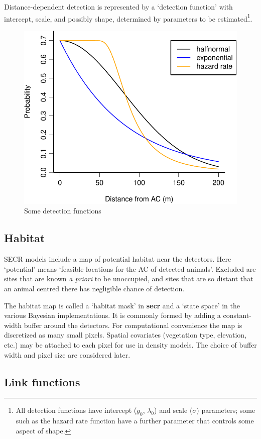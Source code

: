 \documentclass[
]{book}
\begin{document}
Distance-dependent detection is represented by a `detection function' with intercept, scale, and possibly shape, determined by parameters to be estimated\footnote{All detection functions have intercept (\(g_0\), \(\lambda_0\)) and scale (\(\sigma\)) parameters; some such as the hazard rate function have a further parameter that controls some aspect of shape.}.

\begin{figure}
\includegraphics[width=0.75\linewidth]{SECRbook_files/figure-latex/detectionfunctions-1} \caption{Some detection functions}\label{fig:detectionfunctions}
\end{figure}

\subsection{Habitat}\label{habitat}

SECR models include a map of potential habitat near the detectors. Here `potential' means `feasible locations for the AC of detected animals'. Excluded are sites that are known \emph{a priori} to be unoccupied, and sites that are so distant that an animal centred there has negligible chance of detection.

The habitat map is called a `habitat mask' in \textbf{secr} and a `state space' in the various Bayesian implementations. It is commonly formed by adding a constant-width buffer around the detectors. For computational convenience the map is discretized as many small pixels. Spatial covariates (vegetation type, elevation, etc.) may be attached to each pixel for use in density models. The choice of buffer width and pixel size are considered later.

\subsection{Link functions}\label{link}
\end{document}
